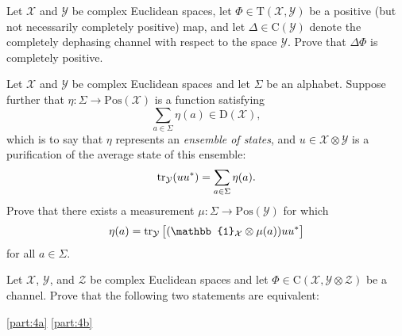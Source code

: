 \documentclass[boxes,pages,color=SeaGreen]{homework}
\newcommand{\I}{\mathbb{1}}
\newcommand{\X}{\mathcal{X}}
\newcommand{\Y}{\mathcal{Y}}
\newcommand{\Z}{\mathcal{Z}}
\newcommand{\W}{\mathcal{W}}
\newcommand{\Lin}{\mathrm{L}}
\newcommand{\Trans}{\mathrm{T}}
\newcommand{\Pos}{\mathrm{Pos}}
\newcommand{\Channel}{\mathrm{C}}
\newcommand{\Density}{\mathrm{D}}
\begin{document}

\begin{problem}
Let $\X$ and $\Y$ be complex Euclidean spaces, let $\Phi\in\Trans(\X,\Y)$
be a positive (but not necessarily completely positive) map, and let
$\Delta\in\Channel(\Y)$ denote the completely dephasing channel with
respect to the space $\Y$.
Prove that $\Delta\Phi$ is completely positive.
\end{problem}

\begin{solution}
\end{solution}


\begin{problem}
Let $\X$ and $\Y$ be complex Euclidean spaces and let $\Sigma$ be an
alphabet.
Suppose further that $\eta:\Sigma\rightarrow\Pos(\X)$ is a function
satisfying
\[
    \sum_{a\in\Sigma} \eta(a) \in \Density(\X),
\]
which is to say that $\eta$ represents an \emph{ensemble of states},
and $u\in\X\otimes\Y$ is a purification of the average state of this
ensemble:
\[
    \tr_{\Y}( u u^{\ast} ) = \sum_{a\in\Sigma} \eta(a).
\]
Prove that there exists a measurement $\mu:\Sigma\rightarrow\Pos(\Y)$ for
which
\[
    \eta(a) = \tr_{\Y} \qty\big[(\I_{\X}\otimes\mu(a))u u^{\ast}]
\]
for all $a\in\Sigma$.
\end{problem}

\begin{solution}
\end{solution}


\begin{problem}
Let $\X$, $\Y$, and $\Z$ be complex Euclidean spaces and let
$\Phi\in\Channel(\X,\Y\otimes\Z)$ be a channel.
Prove that the following two statements are equivalent:
\end{problem}

\begin{solution}
    \ref{part:4a}
    \ref{part:4b}
\end{solution}
\end{document}
